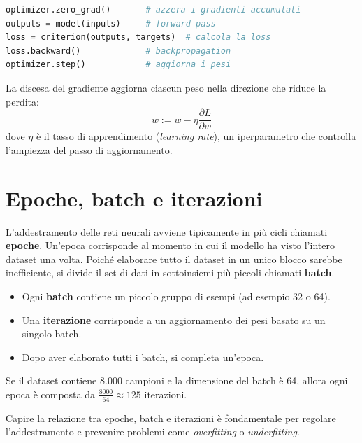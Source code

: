 \documentclass[11pt,a4paper]{report}
\begin{document}
\begin{lstlisting}[language=Python, caption={Esempio di passo di ottimizzazione in PyTorch.}]
optimizer.zero_grad()       # azzera i gradienti accumulati
outputs = model(inputs)     # forward pass
loss = criterion(outputs, targets)  # calcola la loss
loss.backward()             # backpropagation
optimizer.step()            # aggiorna i pesi
\end{lstlisting}

\begin{tcolorbox}[title=Concetto: discesa del gradiente]
La discesa del gradiente aggiorna ciascun peso nella direzione che riduce la perdita:
\[
w := w - \eta \frac{\partial L}{\partial w}
\]
dove $\eta$ è il tasso di apprendimento (\emph{learning rate}), un iperparametro che controlla l’ampiezza del passo di aggiornamento.
\end{tcolorbox}

\section{Epoche, batch e iterazioni}

L’addestramento delle reti neurali avviene tipicamente in più cicli chiamati \textbf{epoche}.  
Un’epoca corrisponde al momento in cui il modello ha visto l’intero dataset una volta.  
Poiché elaborare tutto il dataset in un unico blocco sarebbe inefficiente, si divide il set di dati in sottoinsiemi più piccoli chiamati \textbf{batch}.

\begin{itemize}
  \item Ogni \textbf{batch} contiene un piccolo gruppo di esempi (ad esempio 32 o 64).
  \item Una \textbf{iterazione} corrisponde a un aggiornamento dei pesi basato su un singolo batch.
  \item Dopo aver elaborato tutti i batch, si completa un’epoca.
\end{itemize}

\begin{tcolorbox}[title=Esempio]
Se il dataset contiene 8.000 campioni e la dimensione del batch è 64, allora ogni epoca è composta da $\frac{8000}{64} \approx 125$ iterazioni.
\end{tcolorbox}

Capire la relazione tra epoche, batch e iterazioni è fondamentale per regolare l’addestramento e prevenire problemi come \emph{overfitting} o \emph{underfitting}.
\end{document}
